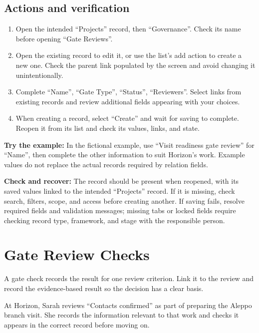 \subsection{Actions and verification}
\begin{enumerate}
\item Open the intended “Projects” record, then “Governance”. Check its name before opening “Gate Reviews”.
\item Open the existing record to edit it, or use the list's add action to create a new one. Check the parent link populated by the screen and avoid changing it unintentionally.
\item Complete “Name”, “Gate Type”, “Status”, “Reviewers”. Select links from existing records and review additional fields appearing with your choices.
\item When creating a record, select “Create” and wait for saving to complete. Reopen it from its list and check its values, links, and state.
\end{enumerate}

\textbf{Try the example:} In the fictional example, use “Visit readiness gate review” for “Name”, then complete the other information to suit Horizon's work. Example values do not replace the actual records required by relation fields.

\textbf{Check and recover:} The record should be present when reopened, with its saved values linked to the intended “Projects” record. If it is missing, check search, filters, scope, and access before creating another. If saving fails, resolve required fields and validation messages; missing tabs or locked fields require checking record type, framework, and stage with the responsible person.

\clearpage
\section{Gate Review Checks}
\label{sec:projects-feature-gate-review-checks}

A gate check records the result for one review criterion. Link it to the review and record the evidence-based result so the decision has a clear basis.

\begin{rcnote}
At Horizon, Sarah reviews “Contacts confirmed” as part of preparing the Aleppo branch visit. She records the information relevant to that work and checks it appears in the correct record before moving on.
\end{rcnote}

